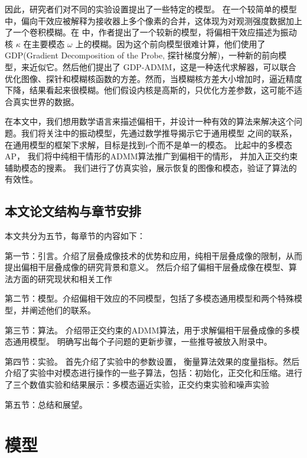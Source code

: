 \documentclass[12pt]{article}
\begin{document}
		因此，研究者们对不同的实验设置提出了一些特定的模型\cite{psf}。 在一个较简单的模型中\cite{direct}，偏向干效应被解释为接收器上多个像素的合并，这体现为对观测强度数据加上了一个卷积模糊。在 \cite{chang} 中，作者提出了一个较新的模型，将偏相干效应描述为振动核 $ \kappa $ 在主要模态 $\omega$ 上的模糊。因为这个前向模型很难计算，他们使用了GDP(Gradient Decomposition of the Probe, 探针梯度分解)，一种新的前向模型，来近似它。然后他们提出了 GDP-ADMM，这是一种迭代求解器，可以联合优化图像、探针和模糊核函数的方差。然而，当模糊核方差大小增加时，逼近精度下降，结果看起来很模糊。他们假设内核是高斯的，只优化方差参数，这可能不适合真实世界的数据。
	
	在本文中，我们想用数学语言来描述偏相干，并设计一种有效的算法来解决这个问题。我们将关注\cite{chang}中的振动模型，先通过数学推导揭示它于通用模型 \cite{mix}之间的联系，在通用模型的框架下求解，目标是找到$r$个而不是单一的模态。 比起\cite{mix}中的多模态AP， 我们将\cite{chang}中纯相干情形的ADMM算法推广到偏相干的情形， 并加入正交约束辅助模态的搜素。 我们进行了仿真实验，展示恢复的图像和模态，验证了算法的有效性。
	
	\subsection{本文论文结构与章节安排}
	本文共分为五节，每章节的内容如下：
	
	第一节：引言。介绍了层叠成像技术的优势和应用，纯相干层叠成像的限制，从而提出偏相干层叠成像的研究背景和意义。 然后介绍了偏相干层叠成像在模型、算法方面的研究现状和相关工作
	
	第二节：模型。介绍偏相干效应的不同模型，包括了多模态通用模型和两个特殊模型，并阐述他们的联系。
	
	第三节：算法。 介绍带正交约束的ADMM算法，用于求解偏相干层叠成像的多模态通用模型。 明确写出每个子问题的更新步骤，一些推导被放入附录中。
	
	第四节：实验。 首先介绍了实验中的参数设置， 衡量算法效果的度量指标。然后介绍了实验中对模态进行操作的一些子算法，包括：初始化，正交化和压缩。进行了三个数值实验和结果展示：多模态逼近实验，正交约束实验和噪声实验
	
	第五节：总结和展望。 
	


	\newpage
\section{模型}
\end{document}
